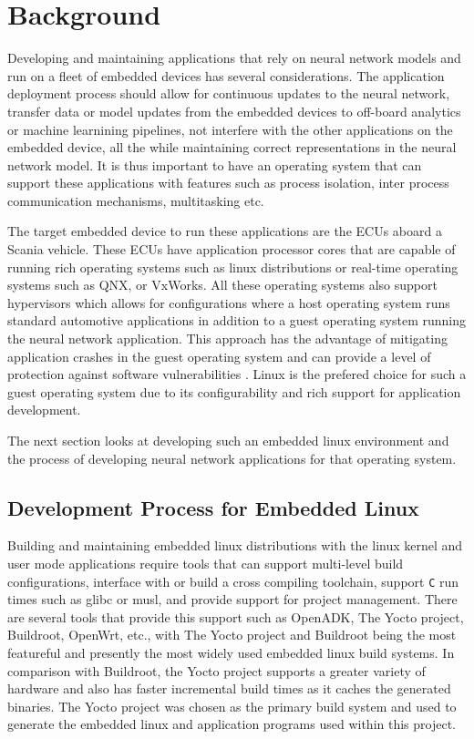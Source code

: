 
\chapter{Background}

Developing and maintaining applications that rely on neural network models and run on a fleet of embedded devices has several considerations. The application deployment process should allow for continuous updates to the neural network, transfer data or model updates from the embedded devices to off-board analytics or machine learnining pipelines, not interfere with the other applications on the embedded device, all the while maintaining correct representations in the neural network model. It is thus important to have an operating system that can support these applications with features such as process isolation, inter process communication mechanisms, multitasking etc.

The target embedded device to run these applications are the ECUs aboard a Scania vehicle. These ECUs have application processor cores that are capable of running rich operating systems such as linux distributions or real-time operating systems such as QNX, or VxWorks. All these operating systems also support hypervisors which allows for configurations where a host operating system runs standard automotive applications in addition to a guest operating system running the neural network application. This approach has the advantage of mitigating application crashes in the guest operating system and can provide a level of protection against software vulnerabilities \cite{linux-guest-os}. Linux is the prefered choice for such a guest operating system due to its configurability and rich support for application development.

The next section looks at developing such an embedded linux environment and the process of developing neural network applications for that operating system.

\section{Development Process for Embedded Linux}

Building and maintaining embedded linux distributions with the linux kernel and user mode applications require tools that can support multi-level build configurations, interface with or build a cross compiling toolchain, support \texttt{C} run times such as glibc or musl, and provide support for project management. There are several tools that provide this support such as OpenADK, The Yocto project, Buildroot, OpenWrt, etc., with The Yocto project and Buildroot being the most featureful and presently the most widely used embedded linux build systems. In comparison with Buildroot, the Yocto project supports a greater variety of hardware and also has faster incremental build times as it caches the generated binaries. The Yocto project was chosen as the primary build system and used to generate the embedded linux and application programs used within this project.

